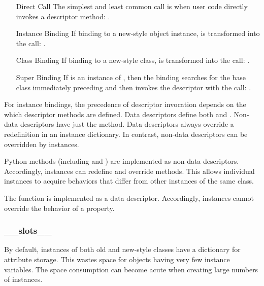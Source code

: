 \begin{itemize}
                      
  \item[Direct Call] The simplest and least common call is when user code
    directly invokes a descriptor method:    .

  \item[Instance Binding]  If binding to a new-style object instance,
     is transformed into the call:
    .
                     
  \item[Class Binding]  If binding to a new-style class, 
    is transformed into the call: .

  \item[Super Binding] If  is an instance of ,
    then the binding  searches
     for the base class  immediately
    preceding  and then invokes the descriptor with the call:
    .
                     
\end{itemize}

For instance bindings, the precedence of descriptor invocation depends
on the which descriptor methods are defined.  Data descriptors define
both  and .  Non-data descriptors have
just the  method.  Data descriptors always override
a redefinition in an instance dictionary.  In contrast, non-data
descriptors can be overridden by instances.

Python methods (including  and )
are implemented as non-data descriptors.  Accordingly, instances can
redefine and override methods.  This allows individual instances to acquire
behaviors that differ from other instances of the same class.                     

The  function is implemented as a data descriptor.
Accordingly, instances cannot override the behavior of a property.


\subsubsection{__slots__\label{slots}}

By default, instances of both old and new-style classes have a dictionary
for attribute storage.  This wastes space for objects having very few instance
variables.  The space consumption can become acute when creating large numbers
of instances.

